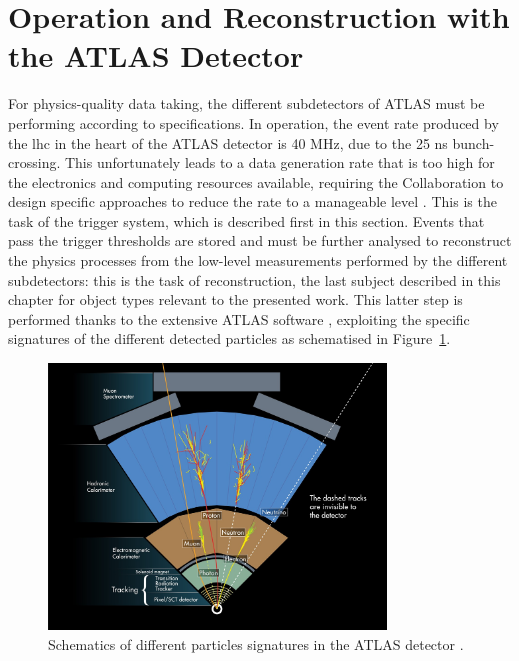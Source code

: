 \section{Operation and Reconstruction with the ATLAS Detector}\label{chap-atlas-reco}
For physics-quality data taking, the different subdetectors of ATLAS must be performing according to specifications. In operation, the event rate produced by the \gls{lhc} in the heart of the ATLAS detector is 40 MHz, due to the 25 ns bunch-crossing. This unfortunately leads to a data generation rate that is too high for the electronics and computing resources available, requiring the Collaboration to design specific approaches to reduce the rate to a manageable level \cite{Nedden_2017}. This is the task of the trigger system, which is described first in this section. Events that pass the trigger thresholds are stored and must be further analysed to reconstruct the physics processes from the low-level measurements performed by the different subdetectors: this is the task of reconstruction, the last subject described in this chapter for object types relevant to the presented work. This latter step is performed thanks to the extensive ATLAS software \cite{ATL-SOFT-PUB-2021-001, ATL-SOFT-PUB-2020-001}, exploiting the specific signatures of the different detected particles as schematised in Figure~\ref{fig-ATLASdetect}.

\begin{figure}[!h]
  \centering
  \includegraphics[width=0.8\textwidth]{Images/ATLAS/ATLASdetection.jpg}
  \caption{Schematics of different particles signatures in the ATLAS detector \cite{Pequenao:1505342}.}
  \label{fig-ATLASdetect}
\end{figure}

